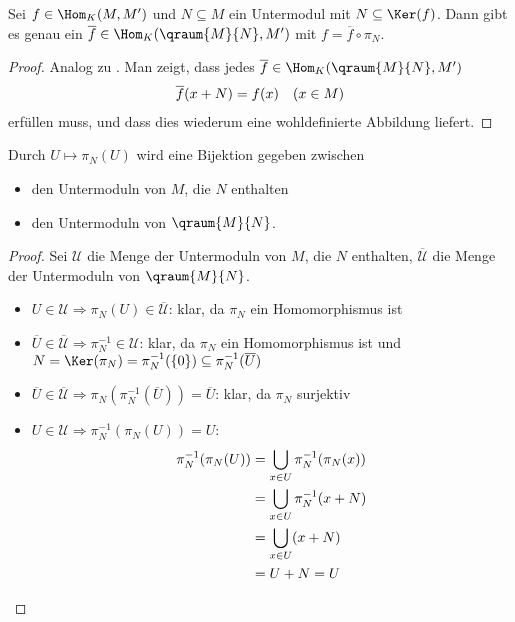 \begin{proposition}
	Sei $f\in\Hom_K(M,M')$ und $N\subseteq M$ ein Untermodul mit $N\subseteq \Ker(f)$. Dann gibt es genau ein $\overline{f}\in\Hom_K(\qraum{M}{N},M')$ mit $f=\overline{f}\circ \pi_N$.
	\begin{center}
	\end{center}
\end{proposition}
\begin{proof}
	Analog zu . Man zeigt, dass jedes $\overline{f}\in\Hom_K(\qraum{M}{N},M')$
	\begin{align}
		\overline{f}(x+N)=f(x)\quad (x\in M)\notag
	\end{align}
	erfüllen muss, und dass dies wiederum eine wohldefinierte Abbildung liefert.
\end{proof}

\begin{lemma}
	Durch $U\mapsto \pi_N(U)$ wird eine Bijektion gegeben zwischen
	\begin{itemize}
		\item den Untermoduln von $M$, die $N$ enthalten
		\item den Untermoduln von $\qraum{M}{N}$.
	\end{itemize}
\end{lemma}
\begin{proof}
	Sei $\mathcal{U}$ die Menge der Untermoduln von $M$, die $N$ enthalten, $\overline{\mathcal{U}}$ die Menge der Untermoduln von $\qraum{M}{N}$.
	\begin{itemize}
		\item $U\in\mathcal{U}\Rightarrow \pi_N(U)\in\overline{\mathcal{U}}$: klar, da $\pi_N$ ein Homomorphismus ist
		\item $\overline{U}\in\overline{\mathcal{U}}\Rightarrow \pi_N^{-1}\in\mathcal{U}$: klar, da $\pi_N$ ein Homomorphismus ist und $N=\Ker(\pi_N)=\pi_N^{-1}(\{0\})\subseteq \pi_N^{-1}(\overline{U})$
		\item $\overline{U}\in\overline{\mathcal{U}}\Rightarrow\pi_N(\pi_N^{-1}(\overline{U}))=\overline{U}$: klar, da $\pi_N$ surjektiv
		\item $U\in\mathcal{U}\Rightarrow \pi_N^{-1}(\pi_N(U))=U$:
		\begin{align}
			\pi_N^{-1}(\pi_N(U)) &= \bigcup_{x\in U} \pi_N^{-1}(\pi_N(x)) \notag \\
			&= \bigcup_{x\in U} \pi_N^{-1}(x+N) \notag \\
			&= \bigcup_{x\in U}(x+N) \notag \\
			&= U+N=U\notag
		\end{align}
	\end{itemize}
\end{proof}

